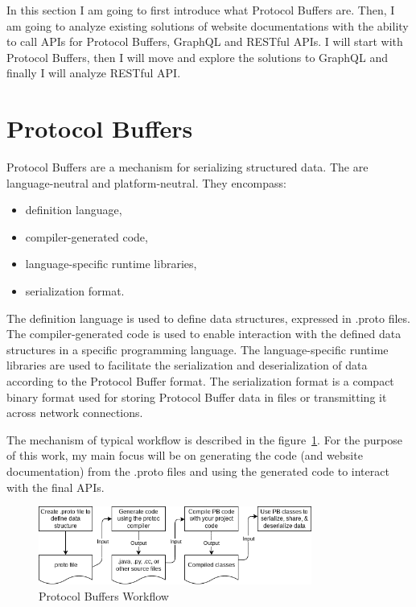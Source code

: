 In this section I am going to first introduce what Protocol Buffers are.
Then, I am going to analyze existing solutions of website documentations with the ability to call APIs for Protocol Buffers, GraphQL and RESTful APIs.
I will start with Protocol Buffers, then I will move and explore the solutions to GraphQL and finally I will analyze RESTful API\@.


\section{Protocol Buffers}
Protocol Buffers are a mechanism for serializing structured data.
The are language-neutral and platform-neutral.
They encompass:
\begin{itemize}
    \item definition language,
    \item compiler-generated code,
    \item language-specific runtime libraries,
    \item serialization format.
\end{itemize}
The definition language is used to define data structures, expressed in .proto files.
The compiler-generated code is used to enable interaction with the defined data structures in a specific programming language.
The language-specific runtime libraries are used to facilitate the serialization and deserialization of data according to the Protocol Buffer format.
The serialization format is a compact binary format used for storing Protocol Buffer data in files or transmitting it across network connections.
\cite{protobuf-overview}

The mechanism of typical workflow is described in the figure~\ref{fig:protobuf-mechanism}.
For the purpose of this work, my main focus will be on generating the code (and website documentation) from the .proto files and using the generated code to interact with the final APIs.
\begin{figure}[hbt!]
    \centering
    \captionsetup{justification=centering}
    \includegraphics[width=0.8\textwidth]{images/protocol-buffers-concepts.png}
    \caption{Protocol Buffers Workflow~\cite{protobuf-overview}}
    \label{fig:protobuf-mechanism}
\end{figure}

